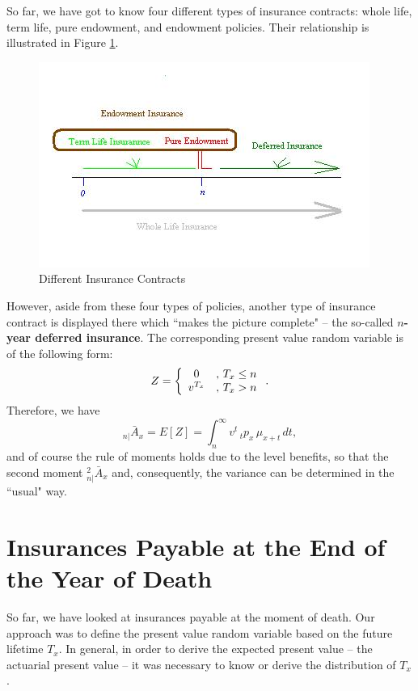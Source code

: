 \documentclass[11pt,fleqn,oneside]{book}
\begin{document}
So far, we have got to know four different types of insurance contracts: whole life, term life, pure endowment, and endowment policies. Their relationship is illustrated in Figure \ref{FIGINSCONCLASS}.
\begin{figure}
\begin{center}
\includegraphics{Graphs/Graph_4_1_Deferred.jpg}
\end{center}
\caption{Different Insurance Contracts \label{FIGINSCONCLASS}}
\end{figure}
However, aside from these four types of policies, another type of insurance contract is displayed there which ``makes the picture complete" -- the so-called \textbf{$n$-year deferred insurance}. The corresponding present value random variable is of the following form:
$$
Z = \left\{\begin{array}{c l}
0 &,\, T_x \leq n \\
v^{T_x} &,\, T_x > n
\end{array}
\right. .
$$ 
Therefore, we have\
$$
{_{n|}\bar{A}_x} = E[Z] = \int_n^{\infty} v^t\,{_tp_x}\,{\mu_{x+t}}\,dt,
$$
and of course the rule of moments holds due to the level benefits, so that the second moment ${^2_{n|}\bar{A}_x}$ and, consequently, the variance can be determined in the ``usual" way. 

\section{Insurances Payable at the End of the Year of Death}
\label{SECPAYATENDOFYEAR}

So far, we have looked at insurances payable at the moment of death. Our approach was to define the present value random variable based on the future lifetime $T_x$. In general, in order to derive the expected present value -- the actuarial present value -- it was necessary to know or derive the distribution of $T_x$.
\end{document}
